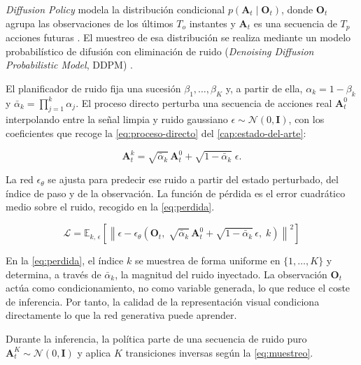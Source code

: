 \textit{Diffusion Policy} modela la distribuci\'on condicional
$p(\mathbf{A}_t \mid \mathbf{O}_t)$, donde $\mathbf{O}_t$ agrupa las observaciones de los
\'ultimos $T_o$ instantes y $\mathbf{A}_t$ es una secuencia de $T_p$ acciones futuras
\cite{chi2025diffusion}. El muestreo de esa distribuci\'on se realiza mediante un modelo
probabil\'istico de difusi\'on con eliminaci\'on de ruido (\textit{Denoising Diffusion
Probabilistic Model}, DDPM) \cite{ho2020ddpm}.

El planificador de ruido fija una sucesi\'on $\beta_1,\dots,\beta_K$ y, a partir de ella,
$\alpha_k = 1-\beta_k$ y $\bar{\alpha}_k = \prod_{j=1}^{k}\alpha_j$. El proceso directo
perturba una secuencia de acciones real $\mathbf{A}^0_t$ interpolando entre la se\~nal
limpia y ruido gaussiano $\epsilon\sim\mathcal{N}(0,\mathbf{I})$, con los coeficientes que
recoge la \cref{eq:proceso-directo} del \cref{cap:estado-del-arte}:

\begin{equation}
  \mathbf{A}^{k}_t = \sqrt{\bar{\alpha}_k}\,\mathbf{A}^0_t
    + \sqrt{1-\bar{\alpha}_k}\;\epsilon .
  \label{eq:perturbacion}
\end{equation}

La red $\epsilon_\theta$ se ajusta para predecir ese ruido a partir del estado perturbado,
del \'indice de paso y de la observaci\'on. La funci\'on de p\'erdida es el error
cuadr\'atico medio sobre el ruido, recogido en la \cref{eq:perdida}.

\begin{equation}
  \mathcal{L} = \mathbb{E}_{k,\,\epsilon}\left[\left\lVert \epsilon -
    \epsilon_\theta\!\left(\mathbf{O}_t,\;
      \sqrt{\bar{\alpha}_k}\,\mathbf{A}^0_t + \sqrt{1-\bar{\alpha}_k}\,\epsilon,\; k\right)
    \right\rVert^2\right]
  \label{eq:perdida}
\end{equation}

En la \cref{eq:perdida}, el \'indice $k$ se muestrea de forma uniforme en
$\{1,\dots,K\}$ y determina, a trav\'es de $\bar{\alpha}_k$, la magnitud del ruido
inyectado. La observaci\'on $\mathbf{O}_t$ act\'ua como condicionamiento, no como variable
generada, lo que reduce el coste de inferencia. Por tanto, la calidad de la
representaci\'on visual condiciona directamente lo que la red generativa puede aprender.

Durante la inferencia, la pol\'itica parte de una secuencia de ruido puro
$\mathbf{A}^K_t\sim\mathcal{N}(0,\mathbf{I})$ y aplica $K$ transiciones inversas seg\'un la
\cref{eq:muestreo}.

